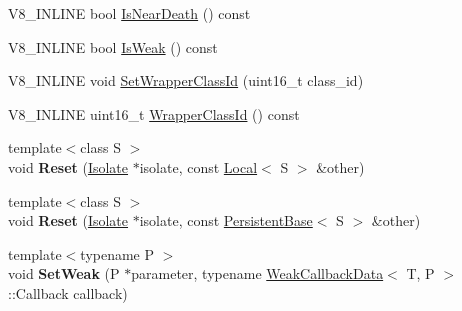 \begin{DoxyCompactItemize}
\item 
V8\+\_\+\+I\+N\+L\+I\+NE bool \hyperlink{classv8_1_1_persistent_base_a4a64c26d91ed6a276aa8a7ca4bb7683a}{Is\+Near\+Death} () const 
\item 
V8\+\_\+\+I\+N\+L\+I\+NE bool \hyperlink{classv8_1_1_persistent_base_a714b7794149df483837a2c6b09d52396}{Is\+Weak} () const 
\item 
V8\+\_\+\+I\+N\+L\+I\+NE void \hyperlink{classv8_1_1_persistent_base_ac4c979164b3ed4dc92319e6f5a108d3d}{Set\+Wrapper\+Class\+Id} (uint16\+\_\+t class\+\_\+id)
\item 
V8\+\_\+\+I\+N\+L\+I\+NE uint16\+\_\+t \hyperlink{classv8_1_1_persistent_base_a01a46bf4e69ed9a837639702ee234643}{Wrapper\+Class\+Id} () const 
\item 
{\footnotesize template$<$class S $>$ }\\void {\bfseries Reset} (\hyperlink{classv8_1_1_isolate}{Isolate} $\ast$isolate, const \hyperlink{classv8_1_1_local}{Local}$<$ S $>$ \&other)\hypertarget{classv8_1_1_persistent_base_ab4b4d3fba3498486f1f10dc7d5be90fc}{}\label{classv8_1_1_persistent_base_ab4b4d3fba3498486f1f10dc7d5be90fc}

\item 
{\footnotesize template$<$class S $>$ }\\void {\bfseries Reset} (\hyperlink{classv8_1_1_isolate}{Isolate} $\ast$isolate, const \hyperlink{classv8_1_1_persistent_base}{Persistent\+Base}$<$ S $>$ \&other)\hypertarget{classv8_1_1_persistent_base_a67cbcedf77d176d3870fa4993e300b61}{}\label{classv8_1_1_persistent_base_a67cbcedf77d176d3870fa4993e300b61}

\item 
{\footnotesize template$<$typename P $>$ }\\void {\bfseries Set\+Weak} (P $\ast$parameter, typename \hyperlink{classv8_1_1_weak_callback_data}{Weak\+Callback\+Data}$<$ T, P $>$\+::Callback callback)\hypertarget{classv8_1_1_persistent_base_aaf342ece1a4ba926ba62e8d6af7be777}{}\label{classv8_1_1_persistent_base_aaf342ece1a4ba926ba62e8d6af7be777}

\end{DoxyCompactItemize}
